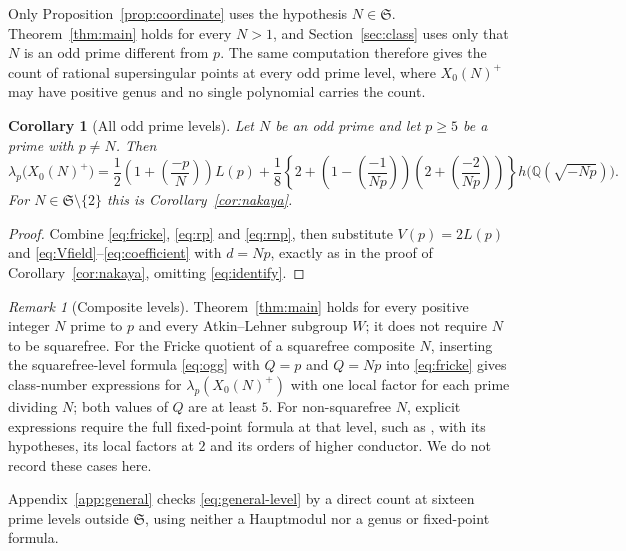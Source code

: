 \documentclass[11pt,a4paper]{article}
\newtheorem{corollary}[theorem]{Corollary}
\theoremstyle{remark}\newtheorem{remark}[theorem]{Remark}
\numberwithin{equation}{section}
\newcommand{\Q}{\mathbb Q}\newcommand{\Z}{\mathbb Z}
\newcommand{\leg}[2]{\left(\frac{#1}{#2}\right)}
\newcommand{\hK}[1]{h\bigl(\Q(\sqrt{-#1})\bigr)}
\begin{document}
	Only Proposition~\ref{prop:coordinate} uses the hypothesis $N\in\mathfrak S$. Theorem~\ref{thm:main} holds for every $N>1$, and Section~\ref{sec:class} uses only that $N$ is an odd prime different from $p$. The same computation therefore gives the count of rational supersingular points at every odd prime level, where $X_0(N)^+$ may have positive genus and no single polynomial carries the count.
	
	\begin{corollary}[All odd prime levels]\label{cor:general}
		Let $N$ be an odd prime and let $p\geq5$ be a prime with $p\neq N$. Then
		\begin{equation}\label{eq:general-level}
			\lambda_p\bigl(X_0(N)^+\bigr)
			=\frac12\left(1+\leg{-p}{N}\right)L(p)
			+\frac18\left\{2+\left(1-\leg{-1}{Np}\right)
			\left(2+\leg{-2}{Np}\right)\right\}\hK{Np}.
		\end{equation}
		For $N\in\mathfrak S\setminus\{2\}$ this is Corollary~\ref{cor:nakaya}.
	\end{corollary}
	\begin{proof}
		Combine \eqref{eq:fricke}, \eqref{eq:rp} and \eqref{eq:rnp}, then substitute $V(p)=2L(p)$ and \eqref{eq:Vfield}--\eqref{eq:coefficient} with $d=Np$, exactly as in the proof of Corollary~\ref{cor:nakaya}, omitting \eqref{eq:identify}.
	\end{proof}
	
	\begin{remark}[Composite levels]
		Theorem~\ref{thm:main} holds for every positive integer $N$ prime to $p$ and every Atkin--Lehner subgroup $W$; it does not require $N$ to be squarefree. For the Fricke quotient of a squarefree composite $N$, inserting the squarefree-level formula \eqref{eq:ogg} with $Q=p$ and $Q=Np$ into \eqref{eq:fricke} gives class-number expressions for $\lambda_p(X_0(N)^+)$ with one local factor for each prime dividing $N$; both values of $Q$ are at least $5$. For non-squarefree $N$, explicit expressions require the full fixed-point formula at that level, such as \cite[Proposition 2.1]{IJK}, with its hypotheses, its local factors at $2$ and its orders of higher conductor. We do not record these cases here.
	\end{remark}
	
	Appendix~\ref{app:general} checks \eqref{eq:general-level} by a direct count at sixteen prime levels outside $\mathfrak S$, using neither a Hauptmodul nor a genus or fixed-point formula.
	
\end{document}
